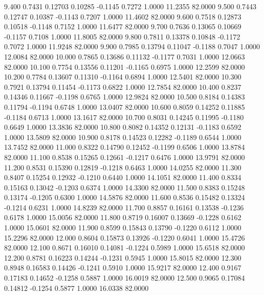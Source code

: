    9.400   0.7431   0.12703   0.10285  -0.1145   0.7272   1.0000  11.2355  82.0000
   9.500   0.7443   0.12747   0.10387  -0.1143   0.7207   1.0000  11.4602  82.0000
   9.600   0.7518   0.12873   0.10518  -0.1148   0.7152   1.0000  11.6477  82.0000
   9.700   0.7636   0.13065   0.10669  -0.1157   0.7108   1.0000  11.8005  82.0000
   9.800   0.7811   0.13378   0.10848  -0.1172   0.7072   1.0000  11.9248  82.0000
   9.900   0.7985   0.13794   0.11047  -0.1188   0.7047   1.0000  12.0084  82.0000
  10.000   0.7865   0.13686   0.11132  -0.1177   0.7031   1.0000  12.0663  82.0000
  10.100   0.7754   0.13556   0.11201  -0.1165   0.6975   1.0000  12.2599  82.0000
  10.200   0.7784   0.13607   0.11310  -0.1164   0.6894   1.0000  12.5401  82.0000
  10.300   0.7921   0.13794   0.11454  -0.1173   0.6822   1.0000  12.7854  82.0000
  10.400   0.8237   0.14346   0.11667  -0.1198   0.6765   1.0000  12.9824  82.0000
  10.500   0.8184   0.14383   0.11794  -0.1194   0.6748   1.0000  13.0407  82.0000
  10.600   0.8059   0.14252   0.11885  -0.1184   0.6713   1.0000  13.1617  82.0000
  10.700   0.8031   0.14245   0.11995  -0.1180   0.6649   1.0000  13.3836  82.0000
  10.800   0.8082   0.14352   0.12131  -0.1183   0.6592   1.0000  13.5809  82.0000
  10.900   0.8178   0.14523   0.12282  -0.1189   0.6544   1.0000  13.7452  82.0000
  11.000   0.8322   0.14790   0.12452  -0.1199   0.6506   1.0000  13.8784  82.0000
  11.100   0.8538   0.15265   0.12661  -0.1217   0.6476   1.0000  13.9791  82.0000
  11.200   0.8531   0.15390   0.12819  -0.1218   0.6463   1.0000  14.0255  82.0000
  11.300   0.8407   0.15254   0.12932  -0.1210   0.6440   1.0000  14.1051  82.0000
  11.400   0.8334   0.15163   0.13042  -0.1203   0.6374   1.0000  14.3300  82.0000
  11.500   0.8383   0.15248   0.13174  -0.1205   0.6300   1.0000  14.5876  82.0000
  11.600   0.8536   0.15482   0.13324  -0.1214   0.6231   1.0000  14.8239  82.0000
  11.700   0.8857   0.16161   0.13538  -0.1236   0.6178   1.0000  15.0056  82.0000
  11.800   0.8719   0.16007   0.13669  -0.1228   0.6162   1.0000  15.0601  82.0000
  11.900   0.8599   0.15843   0.13790  -0.1220   0.6112   1.0000  15.2296  82.0000
  12.000   0.8604   0.15873   0.13926  -0.1220   0.6041   1.0000  15.4726  82.0000
  12.100   0.8671   0.16010   0.14081  -0.1224   0.5989   1.0000  15.6518  82.0000
  12.200   0.8781   0.16223   0.14244  -0.1231   0.5945   1.0000  15.8015  82.0000
  12.300   0.8948   0.16583   0.14426  -0.1241   0.5910   1.0000  15.9217  82.0000
  12.400   0.9167   0.17183   0.14652  -0.1258   0.5887   1.0000  16.0019  82.0000
  12.500   0.9065   0.17084   0.14812  -0.1254   0.5877   1.0000  16.0338  82.0000
